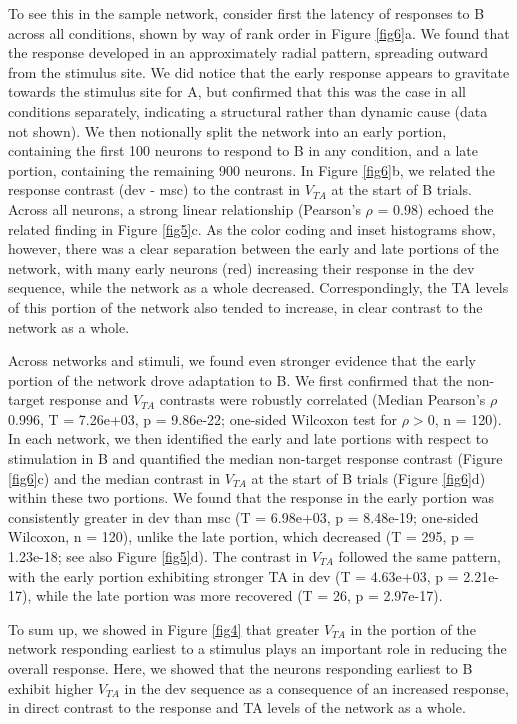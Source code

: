 \documentclass[pdflatex,referee,iicol,sn-basic]{sn-jnl}
\theoremstyle{thmstyleone}%
\theoremstyle{thmstyletwo}%
\theoremstyle{thmstylethree}%
\begin{document}
To see this in the sample network, consider first the latency of responses to B across all conditions, shown by way of rank order in Figure \ref{fig6}a. We found that the response developed in an approximately radial pattern, spreading outward from the stimulus site. We did notice that the early response appears to gravitate towards the stimulus site for A, but confirmed that this was the case in all conditions separately, indicating a structural rather than dynamic cause (data not shown). We then notionally split the network into an early portion, containing the first 100 neurons to respond to B in any condition, and a late portion, containing the remaining 900 neurons. In Figure \ref{fig6}b, we related the response contrast (dev - msc) to the contrast in $V_{TA}$ at the start of B trials. Across all neurons, a strong linear relationship (Pearson's $\rho$ = 0.98) echoed the related finding in Figure \ref{fig5}c. As the color coding and inset histograms show, however, there was a clear separation between the early and late portions of the network, with many early neurons (red) increasing their response in the dev sequence, while the network as a whole decreased. Correspondingly, the TA levels of this portion of the network also tended to increase, in clear contrast to the network as a whole.

Across networks and stimuli, we found even stronger evidence that the early portion of the network drove adaptation to B. We first confirmed that the non-target response and $V_{TA}$ contrasts were robustly correlated (Median Pearson's $\rho$ 0.996, T = 7.26e+03, p = 9.86e-22; one-sided Wilcoxon test for $\rho > 0$, n = 120). In each network, we then identified the early and late portions with respect to stimulation in B and quantified the median non-target response contrast (Figure \ref{fig6}c) and the median contrast in $V_{TA}$ at the start of B trials (Figure \ref{fig6}d) within these two portions. We found that the response in the early portion was consistently greater in dev than msc (T = 6.98e+03, p = 8.48e-19; one-sided Wilcoxon, n = 120), unlike the late portion, which decreased (T = 295, p = 1.23e-18; see also Figure \ref{fig5}d). The contrast in $V_{TA}$ followed the same pattern, with the early portion exhibiting stronger TA in dev (T = 4.63e+03, p = 2.21e-17), while the late portion was more recovered (T = 26, p = 2.97e-17).

To sum up, we showed in Figure \ref{fig4} that greater $V_{TA}$ in the portion of the network responding earliest to a stimulus plays an important role in reducing the overall response. Here, we showed that the neurons responding earliest to B exhibit higher $V_{TA}$ in the dev sequence as a consequence of an increased response, in direct contrast to the response and TA levels of the network as a whole.
\end{document}
